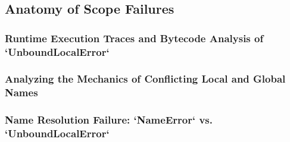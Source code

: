\subsection{Anatomy of Scope Failures}
\subsubsection{Runtime Execution Traces and Bytecode Analysis of `UnboundLocalError`}
\subsubsection{Analyzing the Mechanics of Conflicting Local and Global Names}
\subsubsection{Name Resolution Failure: `NameError` vs. `UnboundLocalError`}
